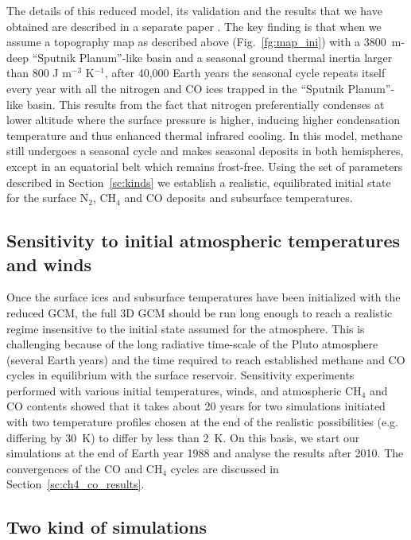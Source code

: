 The details of this reduced model, its validation and the
results that we have obtained are described in a separate paper \cite{Bert:16nat}.
The key finding is that when we assume a topography map as described above (Fig.~\ref{fg:map_ini})
with a 3800~m-deep ``Sputnik Planum''-like basin and a
seasonal ground thermal inertia larger than 800 J m$^{-3}$ K$^{-1}$, after 40,000 Earth years the
seasonal cycle repeats itself every year with all the nitrogen and CO ices trapped in the 
``Sputnik Planum''-like basin. 
This results from the fact that nitrogen preferentially condenses at
lower altitude where the surface pressure is higher, inducing higher condensation
temperature and thus enhanced thermal infrared cooling. 
In this model, methane still undergoes a seasonal cycle and makes seasonal
deposits in both hemispheres, except in an equatorial belt which remains frost-free.
Using the set of parameters described in Section~\ref{sc:kinds} we establish a realistic,
equilibrated initial state for the surface N$_2$, CH$_4$ and CO deposits and subsurface
temperatures.



\subsection{Sensitivity to initial atmospheric temperatures and winds}

Once the surface ices and subsurface temperatures have been initialized with the reduced GCM, the full
3D GCM should be run long enough to reach a realistic regime insensitive to the initial state assumed
for the atmosphere. This is challenging because of the 
long radiative time-scale of the Pluto atmosphere (several Earth years) and the time required to reach
established methane and CO cycles in equilibrium with the surface reservoir. Sensitivity experiments
performed with various initial temperatures, winds, and atmospheric CH$_4$ and CO contents showed that 
it takes about 20 years for two
simulations initiated with two temperature profiles chosen at the end of the realistic possibilities
(e.g. differing by 30~K) to differ by less than 2~K. On this basis, we start our simulations at the
end of Earth year 1988 and analyse the results after 2010. The convergences of the CO and CH$_4$ cycles are
discussed in Section~\ref{sc:ch4_co_results}.


\subsection{Two kind of simulations }

